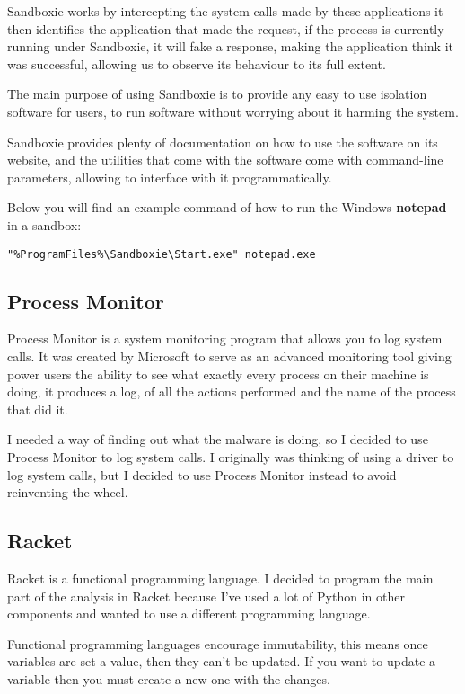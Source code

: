 Sandboxie works by intercepting the system calls made by these applications
it then identifies the application that made the request,
if the process is currently running under Sandboxie,
it will fake a response, making the application think it was successful,
allowing us to observe its behaviour to its full extent.

The main purpose of using Sandboxie is to provide any
easy to use isolation software for users, to run software
without worrying about it harming the system.

Sandboxie provides plenty of documentation on how to use the software on its website,
and the utilities that come with the software come with command-line parameters,
allowing to interface with it programmatically.

Below you will find an example command of how to run the Windows
\textbf{notepad} in a sandbox:

\begin{lstlisting}
"%ProgramFiles%\Sandboxie\Start.exe" notepad.exe
\end{lstlisting}

\subsection{Process Monitor}
Process Monitor is a system monitoring program that allows you to log system calls.
It was created by Microsoft to serve as an advanced monitoring tool giving power users
the ability to see what exactly every process on their machine is doing,
it produces a log, of all the actions performed and the name of the process that did it.

I needed a way of finding out what the malware is doing,
so I decided to use Process Monitor to log system calls.
I originally was thinking of using a driver to log system calls,
but I decided to use Process Monitor instead to avoid reinventing the wheel.

\subsection{Racket}
Racket is a functional programming language.
I decided to program the main part of the analysis in Racket
because I've used a lot of Python in other components and
wanted to use a different programming language.

Functional programming languages encourage immutability,
this means once variables are set a value, then they can't be updated.
If you want to update a variable then you must create a new one with
the changes.


